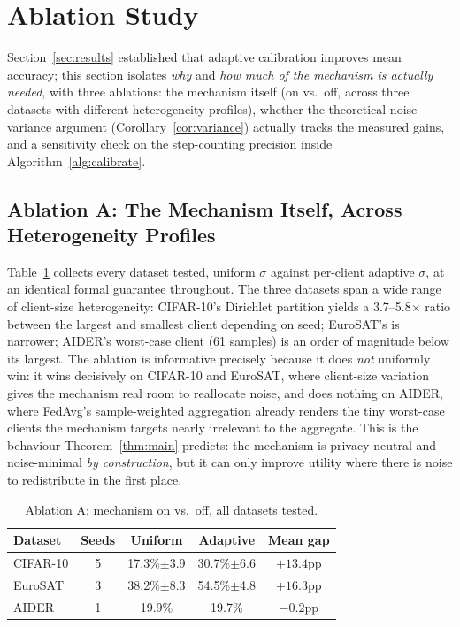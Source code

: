 \documentclass[journal]{IEEEtran}
\begin{document}
\section{Ablation Study}
\label{sec:ablation}

Section~\ref{sec:results} established that adaptive calibration
improves mean accuracy; this section isolates \emph{why} and \emph{how
much of the mechanism is actually needed}, with three ablations: the
mechanism itself (on vs.\ off, across three datasets with different
heterogeneity profiles), whether the theoretical noise-variance
argument (Corollary~\ref{cor:variance}) actually tracks the measured
gains, and a sensitivity check on the step-counting precision inside
Algorithm~\ref{alg:calibrate}.

\subsection{Ablation A: The Mechanism Itself, Across Heterogeneity Profiles}
Table~\ref{tab:ablation-mechanism} collects every dataset tested,
uniform $\sigma$ against per-client adaptive $\sigma$, at an identical
formal guarantee throughout. The three datasets span a wide range of
client-size heterogeneity: CIFAR-10's Dirichlet partition yields a
3.7--5.8$\times$ ratio between the largest and smallest client
depending on seed; EuroSAT's is narrower; AIDER's worst-case client
(61 samples) is an order of magnitude below its largest. The ablation
is informative precisely because it does \emph{not} uniformly win: it
wins decisively on CIFAR-10 and EuroSAT, where client-size variation
gives the mechanism real room to reallocate noise, and does nothing on
AIDER, where FedAvg's sample-weighted aggregation already renders the
tiny worst-case clients the mechanism targets nearly irrelevant to the
aggregate. This is the behaviour Theorem~\ref{thm:main} predicts: the
mechanism is privacy-neutral and noise-minimal \emph{by construction},
but it can only improve utility where there is noise to redistribute
in the first place.

\begin{table}[t]
\centering
\caption{Ablation A: mechanism on vs.\ off, all datasets tested.}
\label{tab:ablation-mechanism}
\begin{tabular}{lcccc}
\toprule
Dataset & Seeds & Uniform & Adaptive & Mean gap \\
\midrule
CIFAR-10 & 5 & 17.3\%$\pm$3.9 & 30.7\%$\pm$6.6 & $+13.4$pp \\
EuroSAT & 3 & 38.2\%$\pm$8.3 & 54.5\%$\pm$4.8 & $+16.3$pp \\
AIDER & 1 & 19.9\% & 19.7\% & $-0.2$pp \\
\bottomrule
\end{tabular}
\end{table}
\end{document}
